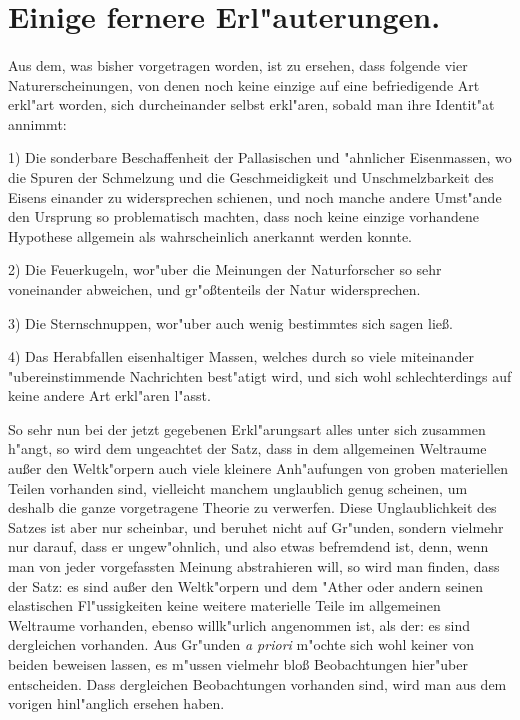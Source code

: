 \documentclass[a4paper, 11pt, oneside, polutonikogreek, german]{article}
\begin{document}
\section{Einige fernere Erl"auterungen.}
\paragraph{}
Aus dem, was bisher vorgetragen worden, ist zu ersehen, dass folgende vier Naturerscheinungen, von denen noch keine einzige auf eine befriedigende Art erkl"art worden, sich durcheinander selbst erkl"aren, sobald man ihre Identit"at annimmt:

1) Die sonderbare Beschaffenheit der Pallasischen und "ahnlicher Eisenmassen, wo die Spuren der Schmelzung und die Geschmeidigkeit und Unschmelzbarkeit des Eisens einander zu widersprechen schienen, und noch manche andere Umst"ande den Ursprung so problematisch machten, dass noch keine einzige vorhandene Hypothese allgemein als wahrscheinlich anerkannt werden konnte.

2) Die Feuerkugeln, wor"uber die Meinungen der Naturforscher so sehr voneinander abweichen, und gr"oßtenteils der Natur widersprechen.

3) Die Sternschnuppen, wor"uber auch wenig bestimmtes sich sagen ließ.

4) Das Herabfallen eisenhaltiger Massen, welches durch so viele miteinander "ubereinstimmende Nachrichten best"atigt wird, und sich wohl schlechterdings auf keine andere Art erkl"aren l"asst.

So sehr nun bei der jetzt gegebenen Erkl"arungsart alles unter sich zusammen h"angt, so wird dem ungeachtet der Satz, dass in dem allgemeinen Weltraume außer den Weltk"orpern auch viele kleinere Anh"aufungen von groben materiellen Teilen vorhanden sind, vielleicht manchem unglaublich genug scheinen, um deshalb die ganze vorgetragene Theorie zu verwerfen. Diese Unglaublichkeit des Satzes ist aber nur scheinbar, und beruhet nicht auf Gr"unden, sondern vielmehr nur darauf, dass er ungew"ohnlich, und also etwas befremdend ist, denn, wenn man von jeder vorgefassten Meinung abstrahieren will, so wird man finden, dass der Satz: es sind außer den Weltk"orpern und dem "Ather oder andern seinen elastischen Fl"ussigkeiten keine weitere materielle Teile im allgemeinen Weltraume vorhanden, ebenso willk"urlich angenommen ist, als der: es sind dergleichen vorhanden. Aus Gr"unden \emph{a priori} m"ochte sich wohl keiner von beiden beweisen lassen, es m"ussen vielmehr bloß Beobachtungen hier"uber entscheiden. Dass dergleichen Beobachtungen vorhanden sind, wird man aus dem vorigen hinl"anglich ersehen haben.
\end{document}
